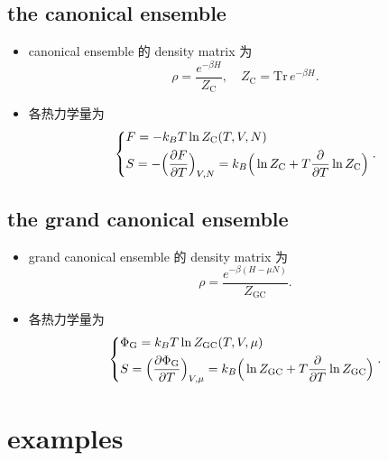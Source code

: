 \subsection{the canonical ensemble}
\begin{itemize}
	\item canonical ensemble 的 density matrix 为
	\begin{equation}
		\rho = \frac{e^{- \beta H}}{Z_\text{C}}, \quad Z_\text{C} = \mathrm{Tr} \, e^{- \beta H}.
	\end{equation}
	
	\item 各热力学量为
	\begin{equation}
		\begin{dcases}
			F = - k_B T \ln Z_\text{C}(T, V, N) \\
			S = - \Big( \frac{\partial F}{\partial T} \Big)_{V, N} = k_B \Big( \ln Z_\text{C} + T \frac{\partial}{\partial T} \ln Z_\text{C} \Big)
		\end{dcases}.
	\end{equation}
\end{itemize}

\subsection{the grand canonical ensemble}
\begin{itemize}
	\item grand canonical ensemble 的 density matrix 为
	\begin{equation}
		\rho = \frac{e^{- \beta (H - \mu N)}}{Z_\text{GC}}.
	\end{equation}
	
	\item 各热力学量为
	\begin{equation}
		\begin{dcases}
			\Phi_\text{G} = k_B T \ln Z_\text{GC}(T, V, \mu) \\
			S = \Big( \frac{\partial \Phi_\text{G}}{\partial T} \Big)_{V, \mu} = k_B \Big( \ln Z_\text{GC} + T \frac{\partial}{\partial T} \ln Z_\text{GC} \Big)
		\end{dcases}.
	\end{equation}
\end{itemize}

\section{examples}
